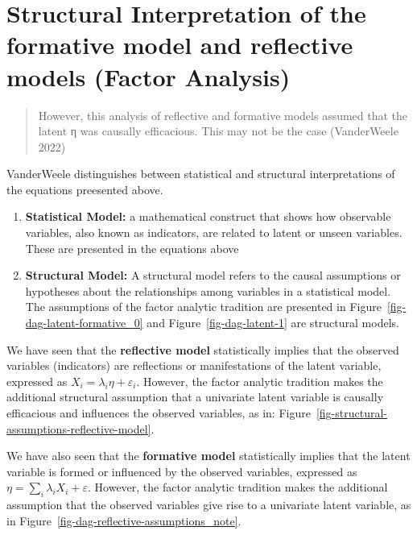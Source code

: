 \documentclass[
  singlecolumn]{report}
\begin{document}
\hypertarget{structural-interpretation-of-the-formative-model-and-reflective-models-factor-analysis}{%
\section{Structural Interpretation of the formative model and reflective
models (Factor
Analysis)}\label{structural-interpretation-of-the-formative-model-and-reflective-models-factor-analysis}}

\begin{quote}
However, this analysis of reflective and formative models assumed that
the latent η was causally efficacious. This may not be the case
(VanderWeele 2022)
\end{quote}

VanderWeele distinguishes between statistical and structural
interpretations of the equations preesented above.

\begin{enumerate}
\def\labelenumi{\arabic{enumi}.}
\item
  \textbf{Statistical Model:} a mathematical construct that shows how
  observable variables, also known as indicators, are related to latent
  or unseen variables. These are presented in the equations above
\item
  \textbf{Structural Model:} A structural model refers to the causal
  assumptions or hypotheses about the relationships among variables in a
  statistical model. The assumptions of the factor analytic tradition
  are presented in Figure~\ref{fig-dag-latent-formative_0} and
  Figure~\ref{fig-dag-latent-1} are structural models.
\end{enumerate}

We have seen that the \textbf{reflective model} statistically implies
that the observed variables (indicators) are reflections or
manifestations of the latent variable, expressed as
\(X_i = \lambda_i \eta + \varepsilon_i\). However, the factor analytic
tradition makes the additional structural assumption that a univariate
latent variable is causally efficacious and influences the observed
variables, as in:
Figure~\ref{fig-structural-assumptions-reflective-model}.

We have also seen that the \textbf{formative model} statistically
implies that the latent variable is formed or influenced by the observed
variables, expressed as \(\eta = \sum_i\lambda_i X_i + \varepsilon\).
However, the factor analytic tradition makes the additional assumption
that the observed variables give rise to a univariate latent variable,
as in Figure~\ref{fig-dag-reflective-assumptions_note}.
\end{document}
